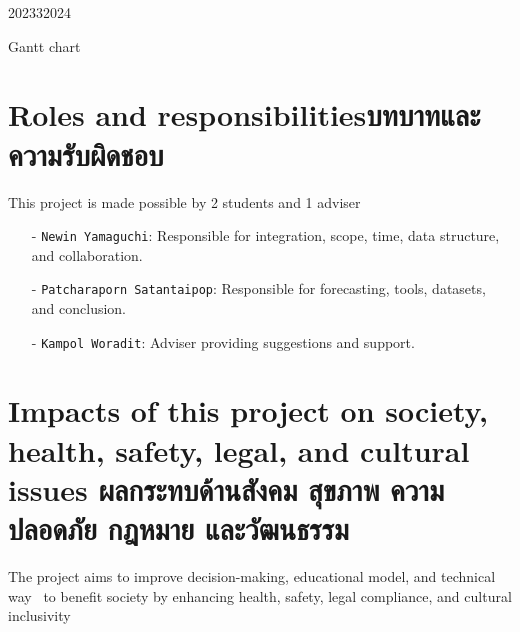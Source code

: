 \begin{table}[H]
\begin{plan}{6}{2023}{3}{2024}
\end{plan}
\caption{Gantt chart}
\end{table}

\section{\ifenglish Roles and responsibilities\else บทบาทและความรับผิดชอบ\fi}
This project is made possible by 2 students and 1 adviser

\begin{itemize}
    \item[-] \texttt{Newin Yamaguchi}\textsf{: Responsible for integration, scope, time, data structure, and collaboration.}
    \item[-] \texttt{Patcharaporn Satantaipop}\textsf{: Responsible for forecasting, tools, datasets, and conclusion.}
    \item[-] \texttt{Kampol Woradit}\textsf{: Adviser providing suggestions and support.}
\end{itemize}

\section{\ifenglish%
Impacts of this project on society, health, safety, legal, and cultural issues
\else%
ผลกระทบด้านสังคม สุขภาพ ความปลอดภัย กฎหมาย และวัฒนธรรม
\fi}

The project aims to improve decision-making, educational model, and technical way~\cite{CNNIC2020} to benefit society by 
enhancing health, safety, legal compliance, and cultural inclusivity